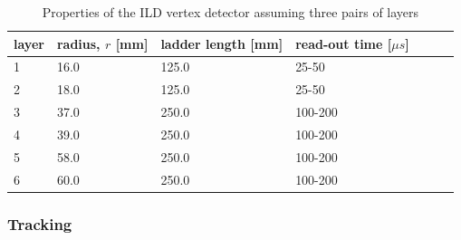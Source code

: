 \begin{table}
  \caption{Properties of the ILD vertex detector assuming three pairs of layers \cite{ILD}}
  \centering

  \begin{tabular}{l l l l l l l}
    \toprule
    layer           & radius, $r$ [mm]         & ladder length [mm]  & read-out time [$\mu s$]  \\
    \midrule
    1 & 16.0 & 125.0 & 25-50 \\
    2 & 18.0 & 125.0 & 25-50 \\
    3 & 37.0 & 250.0 & 100-200 \\
    4 & 39.0 & 250.0 & 100-200 \\
    5 & 58.0 & 250.0 & 100-200 \\
    6 & 60.0 & 250.0 & 100-200 \\
    \bottomrule
  \end{tabular}
  \label{tab:aVTX}

\end{table}


\subsubsection{Tracking}

